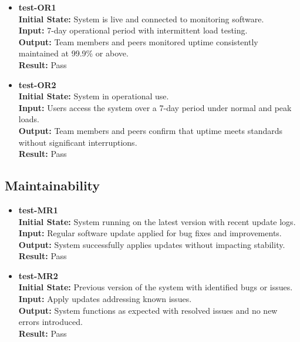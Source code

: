 \documentclass[12pt, titlepage]{article}
\begin{document}
\begin{itemize}
\item \textbf{test-OR1} \label{test-OR1} \\
\textbf{Initial State:} System is live and connected to monitoring software. \\
\textbf{Input:} 7-day operational period with intermittent load testing. \\
\textbf{Output:} Team members and peers monitored uptime consistently maintained at 99.9\% or above. \\
\textbf{Result:} Pass \\

\item \textbf{test-OR2} \label{test-OR2} \\
\textbf{Initial State:} System in operational use. \\
\textbf{Input:} Users access the system over a 7-day period under normal and peak loads. \\
\textbf{Output:} Team members and peers confirm that uptime meets standards without significant interruptions. \\
\textbf{Result:} Pass \\
\end{itemize}

\subsection{Maintainability} \label{section:4.5}

\begin{itemize}
\item \textbf{test-MR1} \label{test-MR1} \\
\textbf{Initial State:} System running on the latest version with recent update logs. \\
\textbf{Input:} Regular software update applied for bug fixes and improvements. \\
\textbf{Output:} System successfully applies updates without impacting stability. \\
\textbf{Result:} Pass \\

\item \textbf{test-MR2} \label{test-MR2} \\
\textbf{Initial State:} Previous version of the system with identified bugs or issues. \\
\textbf{Input:} Apply updates addressing known issues. \\
\textbf{Output:} System functions as expected with resolved issues and no new errors introduced. \\
\textbf{Result:} Pass \\
\end{itemize}
\end{document}
